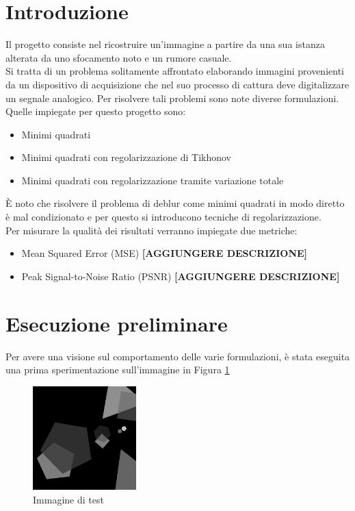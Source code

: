\documentclass[11pt]{article}
\begin{document}
\section*{Introduzione}
Il progetto consiste nel ricostruire un'immagine a partire da una sua istanza alterata da uno sfocamento noto e un rumore casuale.\\
Si tratta di un problema solitamente affrontato elaborando immagini provenienti da un dispositivo di acquisizione che nel suo processo di cattura deve digitalizzare un segnale analogico. 
Per risolvere tali problemi sono note diverse formulazioni. Quelle impiegate per questo progetto sono:
\begin{itemize}
    \setlength\itemsep{0.05cm}
    \item Minimi quadrati
    \item Minimi quadrati con regolarizzazione di Tikhonov
    \item Minimi quadrati con regolarizzazione tramite variazione totale
\end{itemize}
È noto che risolvere il problema di deblur come minimi quadrati in modo diretto è mal condizionato e per questo si introducono tecniche di regolarizzazione.\\
Per misurare la qualità dei risultati verranno impiegate due metriche:
\begin{itemize}
    \setlength\itemsep{0.05cm}
    \item Mean Squared Error (MSE) \textbf{[AGGIUNGERE DESCRIZIONE]}
    \item Peak Signal-to-Noise Ratio (PSNR) \textbf{[AGGIUNGERE DESCRIZIONE]}
\end{itemize}

\section*{Esecuzione preliminare}
Per avere una visione sul comportamento delle varie formulazioni, è stata eseguita una prima sperimentazione sull'immagine in Figura \ref{fig:originale1}
\begin{figure}[H]
    \centering
    \includegraphics[width=4cm]{esecuzione/originale.png}
    \caption{Immagine di test}
    \label{fig:originale1}
\end{figure}
\end{document}
